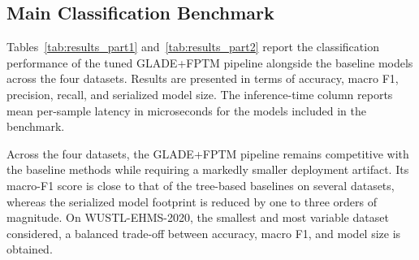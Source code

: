 \documentclass[journal,twoside,web]{ieeecolor}
\begin{document}
\subsection{Main Classification Benchmark}
\label{sec:res-main}

Tables~\ref{tab:results_part1} and~\ref{tab:results_part2} report the
classification performance of the tuned GLADE+FPTM pipeline alongside
the baseline models across the four datasets. Results are presented in
terms of accuracy, macro F1, precision, recall, and serialized model
size. The inference-time column reports mean per-sample latency in
microseconds for the models included in the benchmark.

Across the four datasets, the GLADE+FPTM pipeline remains competitive
with the baseline methods while requiring a markedly smaller
deployment artifact. Its macro-F1 score is close to that of the
tree-based baselines on several datasets, whereas the serialized model
footprint is reduced by one to three orders of magnitude. On
WUSTL-EHMS-2020, the smallest and most variable dataset considered, a
balanced trade-off between accuracy, macro F1, and model size is
obtained.
\end{document}
